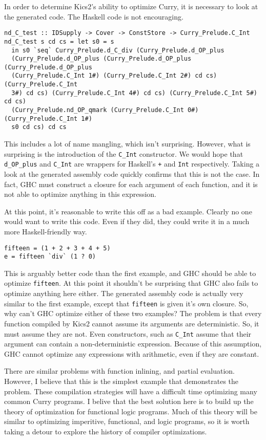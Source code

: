 In order to determine Kics2's ability to optimize Curry, it is necessary to look at the generated code.
The Haskell code is not encouraging.

\begin{verbatim}
nd_C_test :: IDSupply -> Cover -> ConstStore -> Curry_Prelude.C_Int
nd_C_test s cd cs = let s0 = s
  in s0 `seq` Curry_Prelude.d_C_div (Curry_Prelude.d_OP_plus
  (Curry_Prelude.d_OP_plus (Curry_Prelude.d_OP_plus (Curry_Prelude.d_OP_plus
  (Curry_Prelude.C_Int 1#) (Curry_Prelude.C_Int 2#) cd cs) (Curry_Prelude.C_Int
  3#) cd cs) (Curry_Prelude.C_Int 4#) cd cs) (Curry_Prelude.C_Int 5#) cd cs)
  (Curry_Prelude.nd_OP_qmark (Curry_Prelude.C_Int 0#) (Curry_Prelude.C_Int 1#)
  s0 cd cs) cd cs
\end{verbatim}

This includes a lot of name mangling, which isn't surprising.
However, what is surprising is the introduction of the \texttt{C\_Int} constructor.
We would hope that \texttt{d\_OP\_plus} and \texttt{C\_Int} 
are wrappers for Haskell's \texttt{+} and \texttt{Int} respectively.
Taking a look at the generated assembly code quickly confirms that this is not the case.
In fact, GHC must construct a closure for each argument of each function, and it is not able to optimize anything in this expression.

At this point, it's reasonable to write this off as a bad example.  Clearly no one would want to write this code.
Even if they did, they could write it in a much more Haskell-friendly way.

\begin{verbatim}
fifteen = (1 + 2 + 3 + 4 + 5)
e = fifteen `div` (1 ? 0)
\end{verbatim}

This is arguably better code than the first example, and GHC should be able to optimize \texttt{fifteen}.
At this point it shouldn't be surprising that GHC also fails to optimize anything here either.
The generated assembly code is actually very similar to the first example, except that \texttt{fifteen}
is given it's own closure.
So, why can't GHC optimize either of these two examples?
The problem is that every function compiled by Kics2 cannot assume its arguments are deterministic.
So, it must assume they are not.
Even constructors, such as \texttt{C\_Int} assume that their argument can contain a non-deterministic expression.
Because of this assumption, GHC cannot optimize any expressions with arithmetic, even if they are constant.

There are similar problems with function inlining, and partial evaluation.
However, I believe that this is the simplest example that demonstrates the problem.
These compilation strategies will have a difficult time optimizing many common Curry programs.
I belive that the best solution here is to build up the theory of optimization for functional logic programs.
Much of this theory will be similar to optimizing imperitive, functional, and logic programs,
so it is worth taking a detour to explore the history of compiler optimizations.

